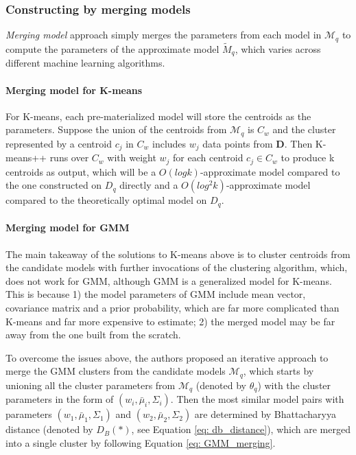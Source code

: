 \subsubsection{Constructing by merging models}
{\em Merging model} approach simply merges the parameters from each model in $\mathcal{M}_q$ to compute the parameters of the approximate model $\tilde{M}_q$, which varies across different machine learning algorithms.

\paragraph{Merging model for K-means}
For K-means, each pre-materialized model will store the centroids as the parameters. Suppose the union of the centroids from $\mathcal{M}_q$ is $C_w$ and the cluster represented by a centroid $c_j$ in $C_w$ includes $w_j$ data points from $\textbf{D}$. Then K-means++ \cite{arthur2007k} runs over $C_w$ with weight $w_j$ for each centroid $c_j \in C_w$ to produce k centroids as output, which will be a $O(log k)$-approximate model compared to the one constructed on $D_q$ directly and a $O(log^2k)$-approximate model compared to the theoretically optimal model on $D_q$.

\paragraph{Merging model for GMM}
The main takeaway of the solutions to K-means above is to cluster centroids from the candidate models with further invocations of the clustering algorithm, which, does not work for GMM, although GMM is a generalized model for K-means. This is because 1) the model parameters of GMM include mean vector, covariance matrix and a prior probability, which are far more complicated than K-means and far more expensive to estimate; 2) the merged model may be far away from the one built from the scratch. 

To overcome the issues above, the authors proposed an iterative approach to merge the GMM clusters from the candidate models $\mathcal{M}_q$, which starts by unioning all the cluster parameters from $\mathcal{M}_q$ (denoted by $\theta_q$) with the cluster parameters in the form of $(w_i, \bar{\mu}_i, \Sigma_i)$.
Then the most similar model pairs with parameters $(w_1, \bar{\mu}_1, \Sigma_1)$ and $(w_2, \bar{\mu}_2, \Sigma_2)$ are determined by Bhattacharyya distance \cite{bhattacharyya1943measure} (denoted by $D_B(*)$, see Equation \ref{eq: db_distance}), which are merged into a single cluster by following Equation \ref{eq: GMM_merging}.

